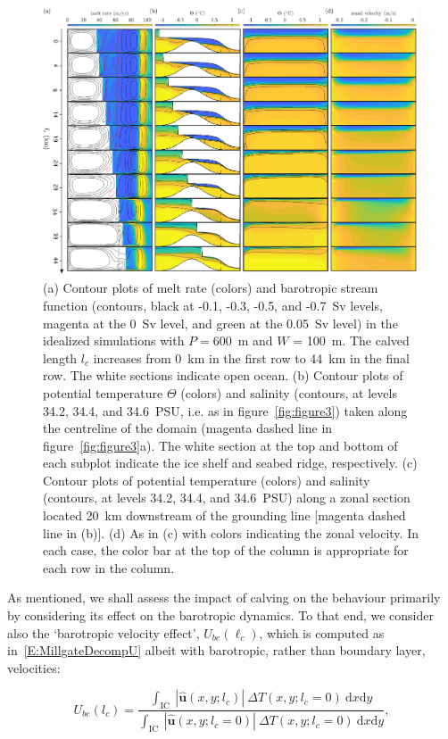 \documentclass[draft]{agujournal2019}
\begin{document}
\begin{figure}
    \centering
    \includegraphics[width = 0.99\textwidth]{../make_figures/plots/figure5.pdf}
    \caption{(a) Contour plots of melt rate (colors) and barotropic stream function (contours, black at -0.1, -0.3, -0.5, and -0.7~Sv levels, magenta at the 0~Sv level, and green at the 0.05~Sv level) in the idealized simulations with $P = 600$~m and $W$ = 100~m. The calved length $l_c$ increases from 0~km in the first row to 44~km in the final row. The white sections indicate open ocean. (b) Contour plots of potential temperature $\Theta$ (colors) and salinity (contours, at levels 34.2, 34.4, and 34.6~PSU, i.e. as in figure~\ref{fig:figure3}) taken along the centreline of the domain (magenta dashed line in figure~\ref{fig:figure3}a). The white section at the top and bottom of each subplot indicate the ice shelf and seabed ridge, respectively. (c) Contour plots of potential temperature (colors) and salinity (contours, at levels 34.2, 34.4, and 34.6~PSU) along a zonal section located 20~km downstream of the grounding line [magenta dashed line in (b)]. (d) As in (c) with colors indicating the zonal velocity.  In each case, the color bar at the top of the column is appropriate for each row in the column. }
    \label{fig:figure5}
\end{figure}

As mentioned, we shall assess the impact of calving on the behaviour primarily by considering its effect on the barotropic dynamics. To that end, we consider also the `barotropic velocity effect', $U_{be}(\ell_c)$, which is computed as in~\eqref{E:MillgateDecompU} albeit with barotropic, rather than boundary layer, velocities:
\begin{linenomath*}
\begin{equation}\label{E:MillgateDecompUbaro}
    U_{be}(l_c)  =  \frac{\int_{\text{IC}}~|\hat{\mathbf{u}}(x,y; l_c)|~\Delta T(x,y;l_c = 0)~\mathrm{d}x\mathrm{d}y}{\int_{\text{IC}}~|\hat{\mathbf{u}}(x,y; l_c = 0)|~\Delta T(x,y;l_c = 0)~\mathrm{d}x\mathrm{d}y},
\end{equation}
\end{linenomath*}
\end{document}
